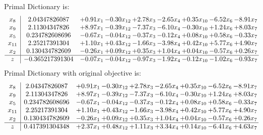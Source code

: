 \documentclass[8pt]{article}
\begin{document}
Primal Dictionary is:
\[\begin{array}{c| c c@{\hskip 2pt} c@{\hskip 2pt} c@{\hskip 2pt} c@{\hskip 2pt} c@{\hskip 2pt} c@{\hskip 2pt} c@{\hskip 2pt} }
 x_{8}   &  2.04347826087 & +  0.91 x_{1} & -0.30 x_{12} & +  2.78 x_{3} & -2.65 x_{4} & +  0.35 x_{10} & -6.52 x_{6} & -8.91 x_{7}\\
 x_{9}   &  2.11304347826 & +  8.97 x_{1} & -0.39 x_{12} & -7.37 x_{3} & -6.10 x_{4} & -0.30 x_{10} & +  1.24 x_{6} & +  8.03 x_{7}\\
 x_{5}   &  0.234782608696 & -0.67 x_{1} & -0.04 x_{12} & -0.37 x_{3} & -0.12 x_{4} & +  0.08 x_{10} & +  0.58 x_{6} & -0.33 x_{7}\\
 x_{11}   &  2.25217391304 & +  1.10 x_{1} & +  0.43 x_{12} & -1.66 x_{3} & -3.98 x_{4} & +  0.42 x_{10} & +  5.77 x_{6} & +  4.90 x_{7}\\
 x_{2}   &  0.130434782609 & -0.26 x_{1} & +  0.09 x_{12} & +  0.35 x_{3} & +  1.04 x_{4} & +  0.04 x_{10} & -0.57 x_{6} & +  0.26 x_{7}\\
\hline
z    &  -0.365217391304 & -0.07 x_{1} & -0.04 x_{12} & -0.97 x_{3} & -1.92 x_{4} & -0.12 x_{10} & -1.02 x_{6} & -0.93 x_{7}\\
\end{array}\]
Primal Dictionary with original objective is:
\[\begin{array}{c| c c@{\hskip 2pt} c@{\hskip 2pt} c@{\hskip 2pt} c@{\hskip 2pt} c@{\hskip 2pt} c@{\hskip 2pt} c@{\hskip 2pt} }
 x_{8}   &  2.04347826087 & +  0.91 x_{1} & -0.30 x_{12} & +  2.78 x_{3} & -2.65 x_{4} & +  0.35 x_{10} & -6.52 x_{6} & -8.91 x_{7}\\
 x_{9}   &  2.11304347826 & +  8.97 x_{1} & -0.39 x_{12} & -7.37 x_{3} & -6.10 x_{4} & -0.30 x_{10} & +  1.24 x_{6} & +  8.03 x_{7}\\
 x_{5}   &  0.234782608696 & -0.67 x_{1} & -0.04 x_{12} & -0.37 x_{3} & -0.12 x_{4} & +  0.08 x_{10} & +  0.58 x_{6} & -0.33 x_{7}\\
 x_{11}   &  2.25217391304 & +  1.10 x_{1} & +  0.43 x_{12} & -1.66 x_{3} & -3.98 x_{4} & +  0.42 x_{10} & +  5.77 x_{6} & +  4.90 x_{7}\\
 x_{2}   &  0.130434782609 & -0.26 x_{1} & +  0.09 x_{12} & +  0.35 x_{3} & +  1.04 x_{4} & +  0.04 x_{10} & -0.57 x_{6} & +  0.26 x_{7}\\
\hline
z    &  0.417391304348 & +  2.37 x_{1} & +  0.48 x_{12} & +  1.11 x_{3} & +  3.34 x_{4} & +  0.14 x_{10} & -6.41 x_{6} & +  4.63 x_{7}\\
\end{array}\]
\end{document}
